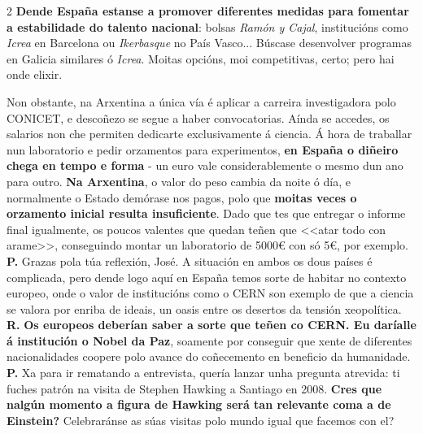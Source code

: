 \begin{refsection}
\begin{multicols}{2}
\textbf{Dende España estanse a promover diferentes medidas para fomentar a estabilidade do talento nacional}: bolsas \emph{Ramón y Cajal}, institucións como \emph{Icrea} en Barcelona ou \emph{Ikerbasque} no País Vasco... Búscase desenvolver programas en Galicia similares ó \emph{Icrea}. Moitas opcións, moi competitivas, certo; pero hai onde elixir.

Non obstante, na Arxentina a única vía é aplicar a carreira investigadora polo CONICET, e descoñezo se segue a haber convocatorias. Aínda se accedes, os salarios non che permiten dedicarte exclusivamente á ciencia. Á hora de traballar nun laboratorio e pedir orzamentos para experimentos, \textbf{en España o diñeiro chega en tempo e forma} - un euro vale considerablemente o mesmo dun ano para outro. \textbf{Na Arxentina}, o valor do peso cambia da noite ó día, e normalmente o Estado demórase nos pagos, polo que \textbf{moitas veces o orzamento inicial resulta insuficiente}. Dado que tes que entregar o informe final igualmente, os poucos valentes que quedan teñen que <<atar todo con arame>>, conseguindo montar un laboratorio de 5000€ con só 5€, por exemplo.\\

\noindent \textbf{P.} \hspace{5px} Grazas pola túa reflexión, José. A situación en ambos os dous países é complicada, pero dende logo aquí en España temos sorte de habitar no contexto europeo, onde o valor de institucións como o CERN son exemplo de que a ciencia se valora por enriba de ideais, un oasis entre os desertos da tensión xeopolítica.\\

\noindent \textbf{R.} \hspace{5px} \textbf{Os europeos deberían saber a sorte que teñen co CERN. Eu daríalle á institución o Nobel da Paz}, soamente por conseguir que xente de diferentes nacionalidades coopere polo avance do coñecemento en beneficio da humanidade.\\

\noindent \textbf{P.} \hspace{5px} Xa para ir rematando a entrevista, quería lanzar unha pregunta atrevida: ti fuches patrón na visita de Stephen Hawking a Santiago en 2008. \textbf{Cres que nalgún momento a figura de Hawking será tan relevante coma a de Einstein?} Celebraránse as súas visitas polo mundo igual que facemos con el?\\


\end{multicols}
\end{refsection}
